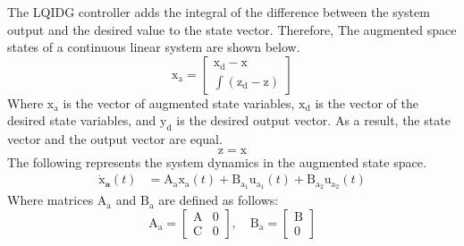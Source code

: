 \documentclass[conference]{IEEEtran}
\begin{document}
The LQIDG controller adds the integral of the difference between the system output and the desired value to the state vector.
Therefore, The augmented space states of a continuous linear system are shown below.
\begin{equation}\label{lqidg_x}
    \boldsymbol{\mathrm{x_a}} = \begin{bmatrix}
        \boldsymbol{\mathrm{x_d}} - \boldsymbol{\mathrm{x}}\\
        \displaystyle \int (\boldsymbol{\mathrm{z_d}} - \boldsymbol{\mathrm{z}})
    \end{bmatrix}
\end{equation}
Where $\boldsymbol{\mathrm{x_a}}$ is the vector of augmented state variables, $\boldsymbol{\mathrm{x_d}}$ is the vector of the desired state variables, and $\boldsymbol{\mathrm{y_d}}$ is the desired output vector.
As a result, the state vector and the output vector are equal.
\begin{equation}
	\boldsymbol{\mathrm{z}} = \boldsymbol{\mathrm{x}}
\end{equation}
The following represents the system dynamics in the augmented state space.
\begin{equation}\label{systemlqidg}
	\begin{split}
		\boldsymbol{\dot{\mathrm{x}}_a}(t) &= \boldsymbol{\mathrm{A_ax_a}}(t) + \boldsymbol{\mathrm{B_{{a_1}}u_{a_1}}}(t) + \boldsymbol{\mathrm{B_{{a_2}}u_{a_2}}}(t)%
	\end{split}
\end{equation}
Where matrices $\boldsymbol{\mathrm{A_a}}$ and $\boldsymbol{\mathrm{B_a}}$ are defined as follows:
\begin{equation}
	\boldsymbol{\mathrm{A_a}} = \begin{bmatrix}
		\boldsymbol{\mathrm{A}} &0\\
		\boldsymbol{\mathrm{C}} & 0
	\end{bmatrix}
, \quad
	\boldsymbol{\mathrm{B_a}} = \begin{bmatrix}
		\boldsymbol{\mathrm{B}}\\
		0
	\end{bmatrix}
\end{equation}
\end{document}
